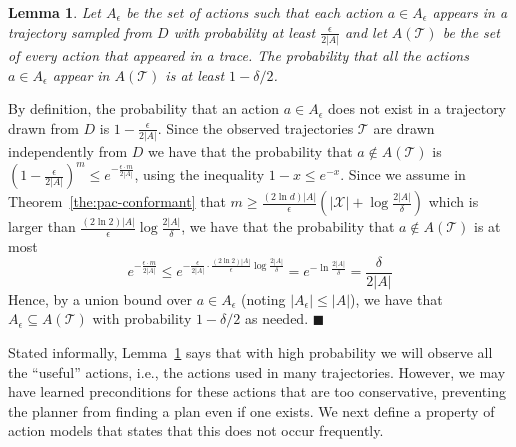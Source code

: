 \documentclass{article}
\newtheorem{lemma}{Lemma}
\newenvironment{proof}{\noindent{\bf Proof:~~}}{\qed}
\newcommand{\qed}{\hfill\ensuremath{\blacksquare}}
\begin{document}
		\begin{lemma}
			Let $A_\epsilon$ be the set of actions such that each action $a\in A_\epsilon$ appears in a trajectory sampled from $D$ with probability at least $\frac{\epsilon}{2|A|}$ and let $A(\mathcal{T})$ be the set of every action that appeared in a trace. 
			The probability that all the actions $a\in A_\epsilon$ 
			appear in $A(\mathcal{T})$ is at least $1-\delta/2$.
			\label{lem:sufficientActions}
		\end{lemma}
		\begin{proof}
			By definition, the probability that an action $a\in A_\epsilon$ does not exist in a trajectory drawn from $D$ is $1-\frac{\epsilon}{2|A|}$. 
			Since the observed trajectories $\mathcal{T}$ are drawn independently from $D$ we have that the probability that $a\notin A(\mathcal{T})$ is
			$(1-\frac{\epsilon}{2|A|})^m\leq e^{-\frac{\epsilon\cdot m}{2|A|}}$, 
			using the inequality $1-x\leq e^{-x}$. 
			Since we assume in Theorem~\ref{the:pac-conformant} that $m\geq\frac{(2\ln d)|A|}{\epsilon}(|\mathcal{X}|+\log\frac{2|A|}{\delta})$
			which is larger than $\frac{(2\ln 2)|A|}{\epsilon}\log\frac{2|A|}{\delta}$, 
			we have that the probability that $a\notin A(\mathcal{T})$ is at most 
			\begin{equation}
			e^{-\frac{\epsilon\cdot m}{2|A|}}
			\leq e^{-\frac{\epsilon}{2|A|} \cdot \frac{(2\ln 2)|A|}{\epsilon}\log\frac{2|A|}{\delta}}
			=e^{-\ln\frac{2|A|}{\delta}}=\frac{\delta}{2|A|}
			\end{equation}
			Hence, by a union bound over $a\in A_\epsilon$ (noting $|A_\epsilon|\leq |A|$), we have that $A_\epsilon\subseteq A(\mathcal{T})$ with probability $1-\delta/2$ as needed.
		\end{proof}
		
		Stated informally, Lemma~\ref{lem:sufficientActions} says that with high probability we will observe
		all the ``useful'' actions, i.e., the actions used in many trajectories. However, we may have learned 
		preconditions for these actions that are too conservative, 
		preventing the planner from finding a plan even if one exists. 
		We next define a property of action models that states that this does not occur frequently. 
		
		
\end{document}
